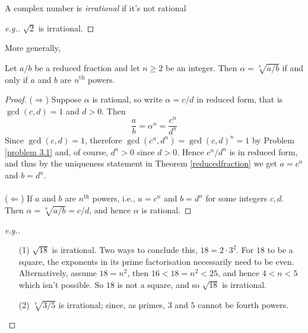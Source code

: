 \vspace*{1em}

\begin{definition}
A complex number is \emph{irrational} if it's not rational
\end{definition}
\begin{proof}[e.g.]\renewcommand{\qedsymbol}{}
$\sqrt{2}$ is irrational. 
\end{proof}

\vspace*{1em}

More generally,

\begin{proposition}
Let $a/b$ be a reduced fraction and let $n\geq 2$ be an integer. Then $\alpha = \sqrt[n]{a/b}$ if and only if $a$ and $b$ are $n^{\text{th}}$ powers.
\end{proposition}
\begin{proof}
($\Rightarrow$) Suppose $\alpha$ is rational, so write $\alpha = c/d$ in reduced form, that is $\gcd(c,d) = 1$ and $d>0$. Then
\[\frac{a}{b} = \alpha^n = \frac{c^n}{d^n}\]
Since $\gcd(c,d) = 1$, therefore $\gcd(c^n,d^n) = \gcd(c,d)^n = 1$ by Problem \ref{problem 3.1} and, of course, $d^n>0$ since $d>0$. Hence $c^n/d^n$ is in reduced form, and thus by the uniqueness statement in Theorem \ref{reducedfraction} we get $a = c^n$ and $b = d^n$.\\
\\
($\Leftarrow$) If $a$ and $b$ are $n^{\text{th}}$ powers, i.e., $a = c^n$ and $b = d^n$ for some integers $c,d$. Then $\alpha = \sqrt[n]{a/b} = c/d$, and hence $\alpha$ is rational.
\end{proof}
\begin{proof}[e.g.]\renewcommand{\qedsymbol}{}
\begin{itemize}
\item[(1)] $\sqrt{18}$ is irrational. Two ways to conclude this, $18 = 2\cdot 3^2$. For $18$ to be a square, the exponents in its prime factorisation necessarily need to be even. Alternatively, assume $18 = n^2$, then $16<18 = n^2<25$, and hence $4 < n < 5$ which isn't possible. So $18$ is not a square, and so $\sqrt{18}$ is irrational.
\end{itemize}
\begin{itemize}[leftmargin=4.4em]
\item[(2)] $\sqrt[4]{3/5}$ is irrational; since, as primes, $3$ and $5$ cannot be fourth powers.
\end{itemize}
\end{proof}

